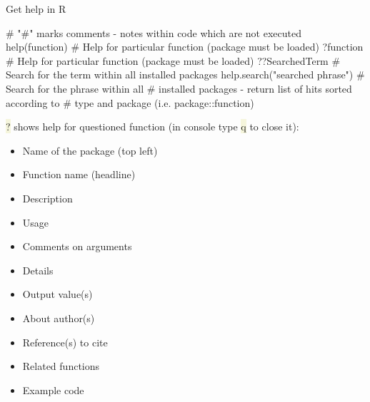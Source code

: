 \documentclass[compress, xelatex, 11pt, xcolor=svgnames, aspectratio=169,
	hyperref={
		bookmarks=true,
		unicode=true,
		colorlinks=true,
		pdftitle={Molecular data in R},
		plainpages=false,
		pdfauthor={Vojtech Zeisek},
		pdfsubject={Course about phylogeny and evolution in R},
		pdfcreator={XeLaTeX},
		pdfkeywords={R, evolution, phylogeny, molecular data},
		linkcolor=Crimson, %
		anchorcolor=Magenta, %
		citecolor=Magenta, %
		filecolor=Magenta, %
		menucolor=Magenta, %
		urlcolor=DodgerBlue, %
		},
	url={hyphens, lowtilde} %
	]{beamer}
\renewcommand{\texttt}[1]{\colorbox{Beige}{{\ttfamily #1}}}
\begin{document}
\begin{frame}[fragile]{Get help in R}
	\begin{spluscode}
    # "#" marks comments - notes within code which are not executed
    help(function) # Help for particular function (package must be loaded)
    ?function # Help for particular function (package must be loaded)
    ??SearchedTerm # Search for the term within all installed packages
    help.search("searched phrase") # Search for the phrase within all
      # installed packages - return list of hits sorted according to
      # type and package (i.e. package::function)
	\end{spluscode}
	\vfill
	\alert{\texttt{?}} shows help for questioned function (in console type \texttt{q} to close it):
	\vfill
	\begin{multicols}{3}
		\begin{itemize}
			\item Name of the package (top left)
			\item Function name (headline)
			\item Description
			\item Usage
			\item Comments on arguments
			\item Details
			\item Output value(s)
			\item About author(s)
			\item Reference(s) to cite
			\item Related functions
			\item Example code
		\end{itemize}
	\end{multicols}
	\vfill
\end{frame}
\end{document}

